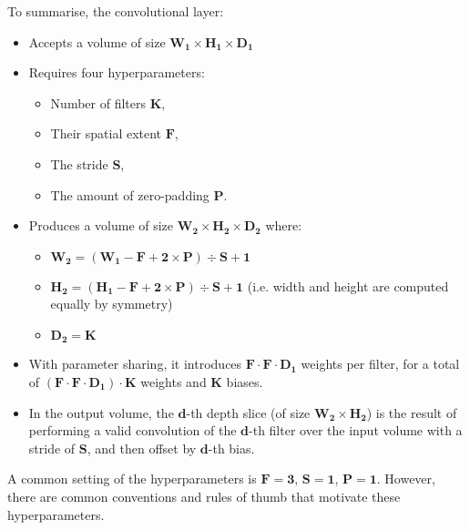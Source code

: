 To summarise, the convolutional layer:
\begin{itemize}
    \item Accepts a volume of size $\boldsymbol{W_{1} \times H_{1}
    \times D_{1}}$
    \item Requires four hyperparameters:
    \begin{itemize}
        \item Number of filters $\boldsymbol{K}$,
        \item Their spatial extent $\boldsymbol{F}$,
        \item The stride $\boldsymbol{S}$,
        \item The amount of zero-padding $\boldsymbol{P}$.
    \end{itemize}
    \item Produces a volume of size
    $\boldsymbol{W_{2} \times H_{2} \times D_{2}}$ where:
    \begin{itemize}
        \item $\boldsymbol{W_{2} = (W_{1} - F + 2 \times P) \div S + 1}$
        \item $\boldsymbol{H_{2} = (H_{1} - F + 2 \times P) \div S + 1}$
        (i.e. width and height are computed equally by symmetry)
        \item $\boldsymbol{D_{2} = K}$
    \end{itemize}
    \item With parameter sharing, it introduces
    $\boldsymbol{F \cdot F \cdot D_{1}}$ weights per filter, for a total of
    $\boldsymbol{(F \cdot F \cdot D_{1}) \cdot K}$ weights and $\boldsymbol{K}$
    biases.
    \item In the output volume, the $\boldsymbol{d}$-th depth slice (of size
    $\boldsymbol{W_{2} \times H_{2}}$) is the result of performing a valid
    convolution of the $\boldsymbol{d}$-th filter over the input volume with a
    stride of $\boldsymbol{S}$, and then offset by $\boldsymbol{d}$-th bias.
\end{itemize}
A common setting of the hyperparameters is $\boldsymbol{F = 3}$,
$\boldsymbol{S = 1}$, $\boldsymbol{P = 1}$. However, there are common
conventions and rules of thumb that motivate these hyperparameters.


